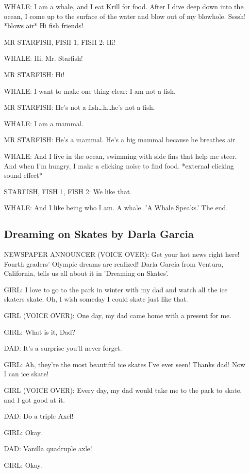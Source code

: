 WHALE:
I am a whale, and I eat Krill for food.
After I dive deep down into the ocean, I come up to the surface of the water and blow out of my blowhole.
Ssssh! *blows air*
Hi fish friends!

MR STARFISH, FISH 1, FISH 2:
Hi!

WHALE:
Hi, Mr.
Starfish!

MR STARFISH:
Hi!

WHALE:
I want to make one thing clear: I am not a fish.

MR STARFISH:
He's not a fish\dots h\dots he's not a fish.

WHALE:
I am a mammal.

MR STARFISH:
He's a mammal.
He's a big mammal because he breathes air.

WHALE:
And I live in the ocean, swimming with side fins that help me steer.
And when I'm hungry, I make a clicking noise to find food.
*external clicking sound effect*

STARFISH, FISH 1, FISH 2:
We like that.

WHALE:
And I like being who I am.
A whale.
'A Whale Speaks.'
The end.

\subsection{Dreaming on Skates by Darla Garcia}

NEWSPAPER ANNOUNCER (VOICE OVER):
Get your hot news right here!
Fourth graders' Olympic dreams are realized!
Darla Garcia from Ventura, California, tells us all about it in 'Dreaming on Skates'.

GIRL:
I love to go to the park in winter with my dad and watch all the ice skaters skate.
Oh, I wish someday I could skate just like that.

GIRL (VOICE OVER):
One day, my dad came home with a present for me.

GIRL:
What is it, Dad?

DAD:
It's a surprise you'll never forget.

GIRL:
Ah, they're the most beautiful ice skates I've ever seen!
Thanks dad!
Now I can ice skate!

GIRL (VOICE OVER):
Every day, my dad would take me to the park to skate, and I got good at it.

DAD:
Do a triple Axel!

GIRL:
Okay.

DAD:
Vanilla quadruple axle!

GIRL:
Okay.

